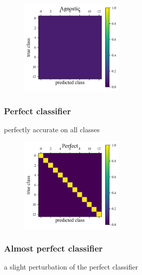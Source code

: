 \begin{figure}
	\begin{center}
		\includegraphics[width=0.45\textwidth]{./fig/Agnostic.png}\\
		\caption{}
		\label{fig:agnostic_data}
	\end{center}
\end{figure}

\subsubsection{Perfect classifier}
\label{sec:perfect_data}

perfectly accurate on all classes

\begin{figure}
	\begin{center}
		\includegraphics[width=0.45\textwidth]{./fig/Perfect.png}\\
		\caption{}
		\label{fig:perfect_data}
	\end{center}
\end{figure}

\subsubsection{Almost perfect classifier}
\label{sec:almost_data}

a slight perturbation of the perfect classifier

